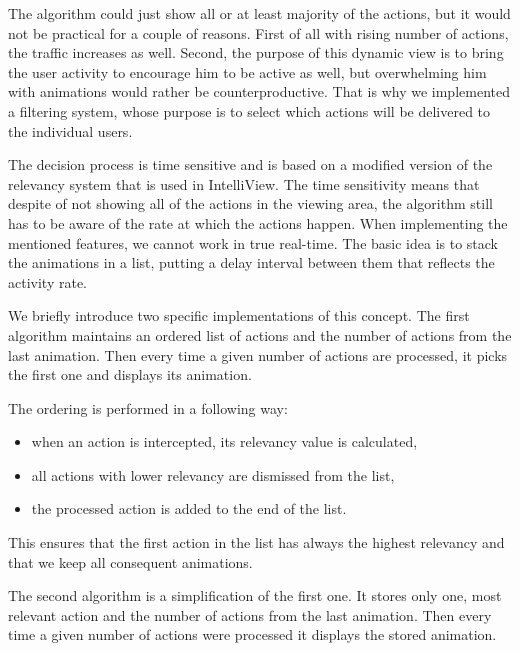 \documentclass{llncs}
\begin{document}
The algorithm could just show all or at least majority of the actions, but it would not be practical for a couple of reasons. First of all with rising number of actions, the traffic increases as well. Second, the purpose of this dynamic view is to bring the user activity to encourage him to be active as well, but overwhelming him with animations would rather be counterproductive. That is why we implemented a filtering system, whose purpose is to select which actions will be delivered to the individual users.

The decision process is time sensitive and is based on a modified version of the relevancy system that is used in IntelliView. The time sensitivity means that despite of not showing all of the actions in the viewing area, the algorithm still has to be aware of the rate at which the actions happen. When implementing the mentioned features, we cannot work in true real-time. The basic idea is to stack the animations in a list, putting a delay interval between them that reflects the activity rate.

We briefly introduce two specific implementations of this concept. The first algorithm maintains an ordered list of actions and the number of actions from the last animation. Then every time a given number of actions are processed, it picks the first one and displays its animation.

The ordering is performed in a following way:
\begin{itemize}
   \item when an action is intercepted, its relevancy value is calculated,
   \item all actions with lower relevancy are dismissed from the list,
   \item the processed action is added to the end of the list.
\end{itemize}
This ensures that the first action in the list has always the highest relevancy and that we keep all consequent animations.

The second algorithm is a simplification of the first one. It stores only one, most relevant action and the number of actions from the last animation. Then every time a given number of actions were processed it displays the stored animation.
\end{document}

